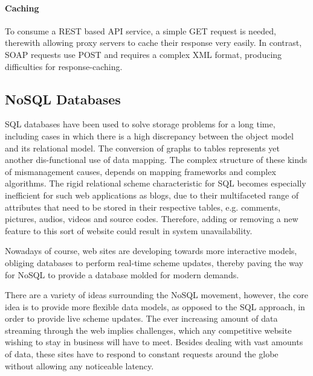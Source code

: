 \paragraph{Caching}

To consume a \ac{REST} based \ac{API} service, a simple GET request is needed, therewith allowing proxy servers to cache their response very easily. In contrast, \ac{SOAP} requests use POST and requires a complex \ac{XML} format, producing difficulties for response-caching.

\subsection{NoSQL Databases \label{sec:back_da_per}}
\ac{SQL} databases have been used to solve storage problems for a long time, including cases in which there is a high discrepancy between the object model and its relational model. The conversion of graphs to tables represents yet another dis-functional use of data mapping. The complex structure of these kinds of mismanagement causes, depends on mapping frameworks and complex algorithms. The rigid relational scheme characteristic for \ac{SQL} becomes especially inefficient for such web applications as blogs, due to their multifaceted range of attributes that need to be stored in their respective tables, e.g. comments, pictures, audios, videos and source codes. Therefore, adding or removing a new feature to this sort of website could result in system unavailability.          

Nowadays of course,  web sites are developing towards more interactive models, obliging databases to perform real-time scheme updates, thereby paving the way for \ac{NoSQL} to provide a database molded for modern demands. %


There are a variety of ideas surrounding the \ac{NoSQL} movement, however, the core idea is to provide more flexible data models, as opposed to the \ac{SQL} approach, in order to provide live scheme updates. The ever increasing amount of data streaming through the web implies challenges, which any competitive website wishing to stay in business will have to meet. Besides dealing with vast amounts of data, these sites have to respond to constant requests around the globe without allowing any noticeable latency.


